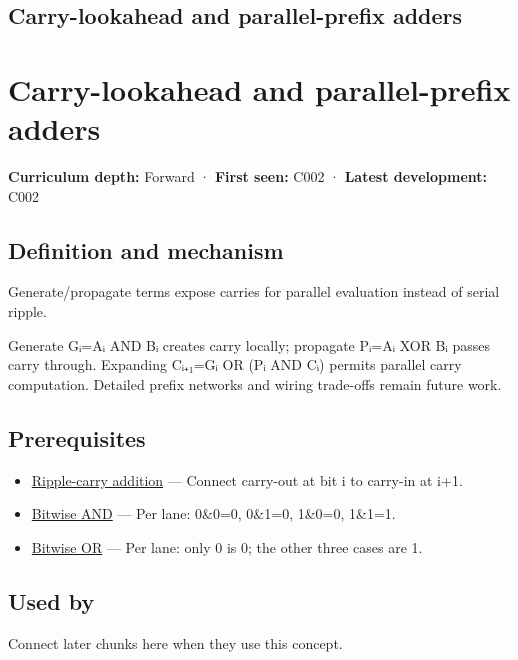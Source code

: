 \hypertarget{appendix-b5c46b2d94ff}{}
\section*{Carry-lookahead and parallel-prefix adders}
\chapter{Carry-lookahead and parallel-prefix adders}\label{appendix-b5c46b2d94ff-carry-lookahead-and-parallel-prefix-adders}

\textbf{Curriculum depth:} Forward · \textbf{First seen:} C002 · \textbf{Latest development:} C002

\section{Definition and mechanism}\label{appendix-b5c46b2d94ff-definition-and-mechanism}

Generate/propagate terms expose carries for parallel evaluation instead of serial ripple.

Generate Gᵢ=Aᵢ AND Bᵢ creates carry locally; propagate Pᵢ=Aᵢ XOR Bᵢ passes carry through. Expanding Cᵢ₊₁=Gᵢ OR (Pᵢ AND Cᵢ) permits parallel carry computation. Detailed prefix networks and wiring trade-offs remain future work.

\section{Prerequisites}\label{appendix-b5c46b2d94ff-prerequisites}

\begin{itemize}
\tightlist
\item
  \hyperref[appendix-17917d9fdbe3]{Ripple-carry addition} --- Connect carry-out at bit i to carry-in at i+1.
\item
  \hyperref[appendix-68b52453737c]{Bitwise AND} --- Per lane: 0\&0=0, 0\&1=0, 1\&0=0, 1\&1=1.
\item
  \hyperref[appendix-a427ce8ce8a6]{Bitwise OR} --- Per lane: only 0 is 0; the other three cases are 1.
\end{itemize}

\section{Used by}\label{appendix-b5c46b2d94ff-used-by}

Connect later chunks here when they use this concept.

